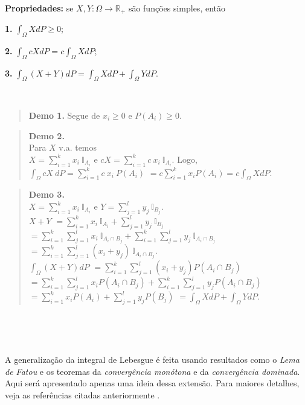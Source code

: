 \documentclass[
]{book}
\begin{document}
\(~\)

\textbf{Propriedades:} se \(X, Y: \Omega \longrightarrow \mathbb{R}_+\) são funções simples, então

\textbf{1.} \(\displaystyle\int_\Omega X dP \geq 0\);

\textbf{2.} \(\displaystyle\int_\Omega cX dP = c\int_\Omega X dP\);

\textbf{3.} \(\displaystyle\int_\Omega (X+Y) dP = \int_\Omega X dP + \int_\Omega Y dP\).

\(~\)

\begin{quote}
\textbf{Demo 1.} Segue de \(x_i \geq 0\) e \(P(A_i) \geq 0\).
\end{quote}

\begin{quote}
\textbf{Demo 2.}\\
Para \(X\) v.a. temos\\
\(X =\displaystyle \sum_{i=1}^kx_i~\mathbb{I}_{A_i}\) e \(cX = \displaystyle\sum_{i=1}^k c~x_i ~\mathbb{I}_{A_i}\). Logo,\\
\(\displaystyle\int_\Omega cX~dP = \sum_{i=1}^k c~x_i~P(A_i)\) \(=\displaystyle c\sum_{i=1}^kx_i P(A_i) = c\int_\Omega X dP\).
\end{quote}

\begin{quote}
\textbf{Demo 3.}\\
\(X = \sum_{i=1}^kx_i~\mathbb{I}_{A_i}\) e \(Y = \sum_{j=1}^ly_j~\mathbb{I}_{B_j}\).\\
\(X + Y\) \(=\displaystyle \sum_{i=1}^k x_i ~\mathbb{I}_{A_i} + \sum_{j=1}^l y_j~\mathbb{I}_{B_j}\) \(=\displaystyle\sum_{i=1}^k\sum_{j=1}^lx_i~\mathbb{I}_{A_i\cap B_j} + \sum_{i=1}^k\sum_{j=1}^ly_j~\mathbb{I}_{A_i\cap B_j}\) \(=\displaystyle\sum_{i=1}^k\sum_{j=1}^l(x_i+y_j)~\mathbb{I}_{A_i\cap B_j}\).\\
\(\displaystyle \int_\Omega (X + Y) dP\) \(=\displaystyle \sum_{i=1}^k\sum_{j=1}^l (x_i + y_j)P(A_i\cap B_j)\) \(=\displaystyle\sum_{i=1}^k\sum_{j=1}^l x_iP(A_i\cap B_j) + \sum_{i=1}^k\sum_{j=1}^l y_jP(A_i\cap B_j)\) \(=\displaystyle\sum_{i=1}^k x_i P(A_i) + \sum_{j=1}^l y_j P(B_j)\) \(=\displaystyle\int_\Omega X dP + \int_\Omega Y dP\).
\end{quote}

\(~\)

\(~\)

A generalização da integral de Lebesgue é feita usando resultados como o \emph{Lema de Fatou} e os teoremas da \emph{convergência monótona} e da \emph{convergência dominada}. Aqui será apresentado apenas uma ideia dessa extensão. Para maiores detalhes, veja as referências citadas anteriormente \citep{Ash00, Schervish12, Billingsley86, Shiryaev96}.
\end{document}
